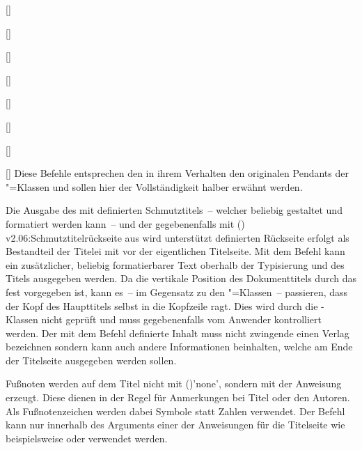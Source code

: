 \begin{Declaration*}{}
\begin{Declaration*}{}
\begin{Declaration*}{}
\begin{Bundle}{}
\begin{Declaration}{[]}
\begin{Declaration}{[]}
\begin{Declaration}{[]}
\begin{Declaration}{[]}
\begin{Declaration}{[]}
\begin{Declaration}{[]}
\begin{Declaration}{[]}
\begin{Declaration}{[]}
\printdeclarationlist%
%
Diese Befehle entsprechen den in ihrem Verhalten den originalen Pendants der 
\KOMAScript"=Klassen und sollen hier der Vollständigkeit halber erwähnt werden.

Die Ausgabe des mit  definierten Schmutztitels~-- welcher 
beliebig gestaltet und formatiert werden kann~-- und der gegebenenfalls mit 
(){%
  v2.06:Schmutztitelrückseite aus  wird unterstützt%
}%
 definierten Rückseite erfolgt als Bestandteil der Titelei 
mit  vor der eigentlichen Titelseite. Mit dem Befehl 
 kann ein zusätzlicher, beliebig formatierbarer Text oberhalb 
der Typisierung und des Titels ausgegeben werden. Da die vertikale Position des 
Dokumenttitels durch das \CD fest vorgegeben ist, kann es~-- im Gegensatz zu 
den \KOMAScript"=Klassen~-- passieren, dass der Kopf des Haupttitels selbst in 
die Kopfzeile ragt. Dies wird durch die \TUDScript-Klassen nicht geprüft und 
muss gegebenenfalls vom Anwender kontrolliert werden. Der mit dem Befehl 
 definierte Inhalt muss nicht zwingende einen Verlag 
bezeichnen sondern kann auch andere Informationen beinhalten, welche am Ende 
der Titelseite ausgegeben werden sollen.

Fußnoten werden auf dem Titel nicht mit 
()'none', sondern mit der Anweisung 
 erzeugt. Diese dienen in der Regel für Anmerkungen bei Titel 
oder den Autoren. Als Fußnotenzeichen werden dabei Symbole statt Zahlen 
verwendet. Der Befehl  kann nur innerhalb des Arguments einer der 
Anweisungen für die Titelseite wie beispielsweise  oder 
 verwendet werden.


\end{Declaration}
\end{Declaration}
\end{Declaration}
\end{Declaration}
\end{Declaration}
\end{Declaration}
\end{Declaration}
\end{Declaration}
\end{Bundle}
\end{Declaration*}
\end{Declaration*}
\end{Declaration*}
